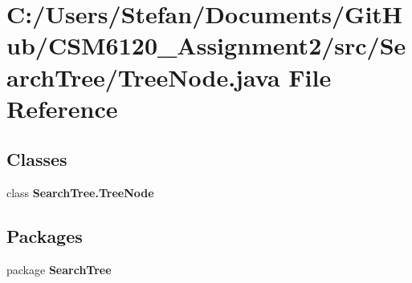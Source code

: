 \section{C\+:/\+Users/\+Stefan/\+Documents/\+Git\+Hub/\+C\+S\+M6120\+\_\+\+Assignment2/src/\+Search\+Tree/\+Tree\+Node.java File Reference}
\label{_tree_node_8java}
\subsection*{Classes}
\begin{DoxyCompactItemize}
\item 
class {\bf Search\+Tree.\+Tree\+Node}
\end{DoxyCompactItemize}
\subsection*{Packages}
\begin{DoxyCompactItemize}
\item 
package {\bf Search\+Tree}
\end{DoxyCompactItemize}
